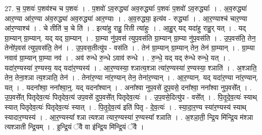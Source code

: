 \documentclass[17pt]{extarticle}
\begin{document}
27. च॒ प॒शवः॑ प॒शव॑श्च च प॒शवः॑ । . प॒शवो॑ ऽव॒रुद्ध्या॑ अव॒रुद्ध्याः᳚ प॒शवः॑ प॒शवो॑ ऽव॒रुद्ध्याः᳚ । . अ॒व॒रुद्ध्या॑ आर॒ण्या आ॑र॒ण्या अ॑व॒रुद्ध्या॑ अव॒रुद्ध्या॑ आर॒ण्याः । . अ॒व॒रुद्ध्या॒ इत्य॑व - रुद्ध्याः᳚ । . आ॒र॒ण्याश्च॑ चार॒ण्या आ॑र॒ण्याश्च॑ । . चे तीति॑ च॒ चे ति॑ । . इत्या॑हु राहु॒ रिती त्या॑हुः । . आ॒हु॒र् यद् यदा॑हु राहु॒र् यत् । . यद् ग्रा॒म्यान् ग्रा॒म्यान्. यद् यद् ग्रा॒म्यान् । . ग्रा॒म्या नु॑प॒वस॑ त्युप॒वस॑ति ग्रा॒म्यान् ग्रा॒म्या नु॑प॒वस॑ति । . उ॒प॒वस॑ति॒ तेन॒ तेनो॑प॒वस॑ त्युप॒वस॑ति॒ तेन॑ । . उ॒प॒वस॒तीत्यु॑प - वस॑ति । . तेन॑ ग्रा॒म्यान् ग्रा॒म्यान् तेन॒ तेन॑ ग्रा॒म्यान् । . ग्रा॒म्या नवाव॑ ग्रा॒म्यान् ग्रा॒म्या नव॑ । . अव॑ रुन्धे रु॒न्धे ऽवाव॑ रुन्धे । . रु॒न्धे॒ यद् यद् रु॑न्धे रुन्धे॒ यत् । . यदा॑र॒ण्यस्या॑ र॒ण्यस्य॒ यद् यदा॑र॒ण्यस्य॑ । . आ॒र॒ण्यस्या॒ श्ञात्य॒श्ञा त्या॑र॒ण्यस्या॑ र॒ण्यस्या॒ श्ञाति॑ । . अ॒श्ञाति॒ तेन॒ तेना॒श्ञा त्य॒श्ञाति॒ तेन॑ । . तेना॑र॒ण्या ना॑र॒ण्यान् तेन॒ तेना॑र॒ण्यान् । . आ॒र॒ण्यान्. यद् यदा॑र॒ण्या ना॑र॒ण्यान्. यत् । . यदना᳚श्वा॒ नना᳚श्वा॒न्॒. यद् यदना᳚श्वान् । . अना᳚श्वा नुप॒वसे॑ दुप॒वसे॒ दना᳚श्वा॒ नना᳚श्वा नुप॒वसे᳚त् । . उ॒प॒वसे᳚त् पितृदेव॒त्यः॑ पितृदेव॒त्य॑ उप॒वसे॑ दुप॒वसे᳚त् पितृदेव॒त्यः॑ । . उ॒प॒वसे॒दित्यु॑प - वसे᳚त् । . पि॒तृ॒दे॒व॒त्यः॑ स्याथ् स्यात् पितृदेव॒त्यः॑ पितृदेव॒त्यः॑ स्यात् । . पि॒तृ॒दे॒व॒त्य॑ इति॑ पितृ - दे॒व॒त्यः॑ । . स्या॒दा॒र॒ण्य स्या॑र॒ण्यस्य॑ स्याथ् स्यादार॒ण्यस्य॑ । . आ॒र॒ण्यस्या᳚ श्ञा त्यश्ञा त्यार॒ण्यस्या॑ र॒ण्यस्या᳚ श्ञाति । . अ॒श्ञा॒ती॒ न्द्रि॒य मि॑न्द्रि॒य म॑श्ञा त्यश्ञाती न्द्रि॒यम् । . इ॒न्द्रि॒यं ॅवै वा इ॑न्द्रि॒य मि॑न्द्रि॒यं ॅवै । \newline
\end{document}
